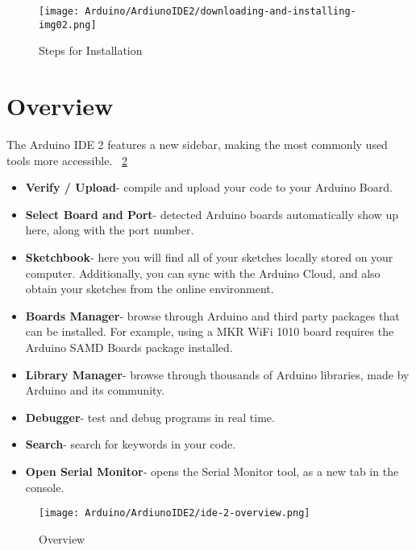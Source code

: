 \begin{figure}
    \begin{center}
        \texttt{[image: Arduino/ArdiunoIDE2/downloading-and-installing-img02.png]}
        \caption{Steps for Installation}
        \label{downloading-and-installing-img02}
    \end{center}
\end{figure}

\section{Overview}
The Arduino IDE 2 features a new sidebar, making the most commonly used tools more accessible. ~\ref{ide-2-overview} \cite{arduinodescription:2024}

\begin{itemize}
    \item \textbf{Verify / Upload}- compile and upload your code to your Arduino Board.
    \item \textbf{Select Board and Port}- detected Arduino boards automatically show up here, along with the port number.
    \item \textbf{Sketchbook}- here you will find all of your sketches locally stored on your computer. Additionally, you can sync with the Arduino Cloud, and also obtain your sketches from the online environment.
    \item \textbf{Boards Manager}- browse through Arduino and third party packages that can be installed. For example, using a MKR WiFi 1010 board requires the Arduino SAMD Boards package installed.
    \item \textbf{Library Manager}- browse through thousands of Arduino libraries, made by Arduino and its community.
    \item \textbf{Debugger}- test and debug programs in real time.
    \item \textbf{Search}- search for keywords in your code.
    \item \textbf{Open Serial Monitor}- opens the Serial Monitor tool, as a new tab in the console.
\end{itemize}

\begin{figure}
    \begin{center}
        \texttt{[image: Arduino/ArdiunoIDE2/ide-2-overview.png]}
        \caption{Overview}
        \label{ide-2-overview}
    \end{center}
\end{figure}

